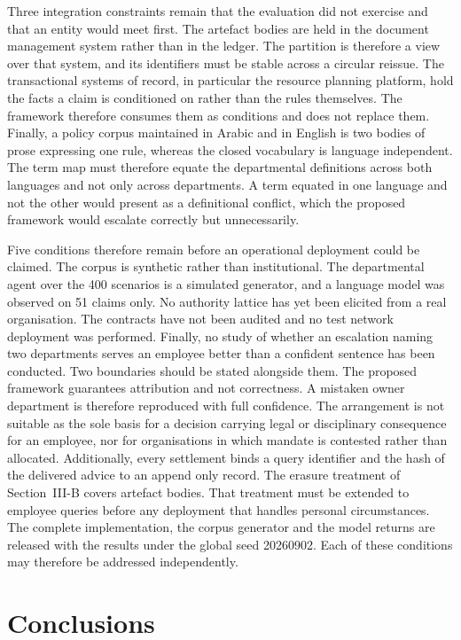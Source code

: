 \documentclass[journal]{IEEEtran}
\begin{document}
Three integration constraints remain that the evaluation did not exercise and that an entity would meet first. The artefact bodies are held in the document management system rather than in the ledger. The partition is therefore a view over that system, and its identifiers must be stable across a circular reissue. The transactional systems of record, in particular the resource planning platform, hold the facts a claim is conditioned on rather than the rules themselves. The framework therefore consumes them as conditions and does not replace them. Finally, a policy corpus maintained in Arabic and in English is two bodies of prose expressing one rule, whereas the closed vocabulary is language independent. The term map must therefore equate the departmental definitions across both languages and not only across departments. A term equated in one language and not the other would present as a definitional conflict, which the proposed framework would escalate correctly but unnecessarily.

Five conditions therefore remain before an operational deployment could be claimed. The corpus is synthetic rather than institutional. The departmental agent over the 400 scenarios is a simulated generator, and a language model was observed on 51 claims only. No authority lattice has yet been elicited from a real organisation. The contracts have not been audited and no test network deployment was performed. Finally, no study of whether an escalation naming two departments serves an employee better than a confident sentence has been conducted. Two boundaries should be stated alongside them. The proposed framework guarantees attribution and not correctness. A mistaken owner department is therefore reproduced with full confidence. The arrangement is not suitable as the sole basis for a decision carrying legal or disciplinary consequence for an employee, nor for organisations in which mandate is contested rather than allocated. Additionally, every settlement binds a query identifier and the hash of the delivered advice to an append only record. The erasure treatment of Section~III-B covers artefact bodies. That treatment must be extended to employee queries before any deployment that handles personal circumstances. The complete implementation, the corpus generator and the model returns are released with the results under the global seed 20260902. Each of these conditions may therefore be addressed independently.

\section{Conclusions}
\end{document}
